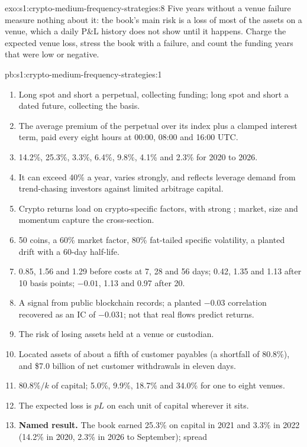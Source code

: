 \begin{solution}{exo:s1:crypto-medium-frequency-strategies:8}
Five years without a venue failure measure nothing about it: the book's main risk is a loss of most of the assets on a venue, which a daily P\&L history
does not show until it happens. Charge the expected venue loss, stress the book with a failure, and count the funding years that were low or negative.
\end{solution}

\begin{solution}{pb:s1:crypto-medium-frequency-strategies:1}
\begin{enumerate}
\item Long spot and short a perpetual, collecting funding; long spot and short a dated future, collecting the basis.
\item The average premium of the perpetual over its index plus a clamped interest term, paid every eight hours at 00:00, 08:00 and 16:00 UTC.
\item 14.2\%, 25.3\%, 3.3\%, 6.4\%, 9.8\%, 4.1\% and 2.3\% for 2020 to 2026.
\item It can exceed 40\% a year, varies strongly, and reflects leverage demand from trend-chasing investors against limited arbitrage capital.
\item Crypto returns load on crypto-specific factors, with strong ; market, size and momentum capture the cross-section.
\item 50 coins, a 60\% market factor, 80\% fat-tailed specific volatility, a planted drift with a 60-day half-life.
\item 0.85, 1.56 and 1.29 before costs at 7, 28 and 56 days; 0.42, 1.35 and 1.13 after 10 basis points; $-0.01$, 1.13 and 0.97 after 20.
\item A signal from public blockchain records; a planted $-0.03$ correlation recovered as an IC of $-0.031$; not that real flows predict returns.
\item The risk of losing assets held at a venue or custodian.
\item Located assets of about a fifth of customer payables (a shortfall of 80.8\%), and \$7.0 billion of net customer withdrawals in eleven days.
\item $80.8\%/k$ of capital; 5.0\%, 9.9\%, 18.7\% and 34.0\% for one to eight venues.
\item The expected loss is $pL$ on each unit of capital wherever it sits.
\item \textbf{Named result.} The  book earned 25.3\% on capital in 2021 and 3.3\% in 2022 (14.2\% in 2020, 2.3\% in 2026 to September); spread

\end{enumerate}
\end{solution}
